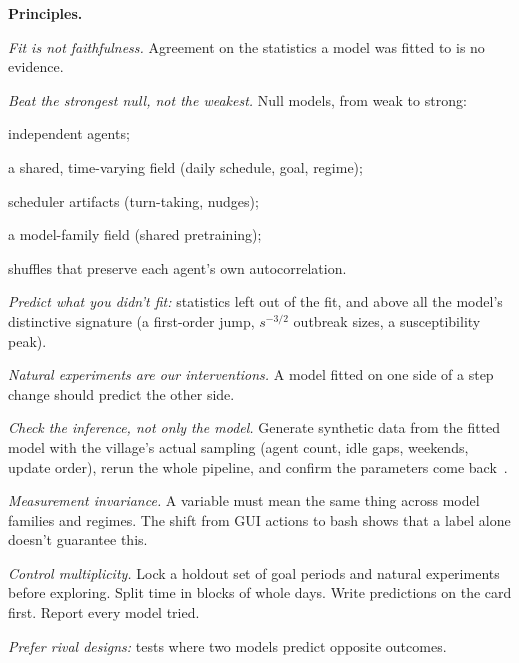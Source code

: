 \documentclass[reprint,aps,pre,10pt,superscriptaddress,nofootinbib]{revtex4-2}
\newenvironment{tight}{\begin{list}{\textbullet}{\setlength{\itemsep}{0pt}\setlength{\parsep}{0pt}\setlength{\topsep}{2pt}\setlength{\partopsep}{0pt}\setlength{\leftmargin}{1.1em}\setlength{\labelwidth}{0.6em}\setlength{\labelsep}{0.4em}}}{\end{list}}
\begin{document}
\textbf{Principles.}
\begin{tight}
\item \emph{Fit is not faithfulness.} Agreement on the statistics a model was fitted to is no evidence.
\item \emph{Beat the strongest null, not the weakest.} Null models, from weak to strong:
  \begin{tight}
  \item independent agents;
  \item a shared, time-varying field (daily schedule, goal, regime);
  \item scheduler artifacts (turn-taking, nudges);
  \item a model-family field (shared pretraining);
  \item shuffles that preserve each agent's own autocorrelation.
  \end{tight}
\item \emph{Predict what you didn't fit:} statistics left out of the fit, and above all the model's distinctive signature (a first-order jump, $s^{-3/2}$ outbreak sizes, a susceptibility peak).
\item \emph{Natural experiments are our interventions.} A model fitted on one side of a step change should predict the other side.
\item \emph{Check the inference, not only the model.} Generate synthetic data from the fitted model with the village's actual sampling (agent count, idle gaps, weekends, update order), rerun the whole pipeline, and confirm the parameters come back~\cite{talts2018}.
\item \emph{Measurement invariance.} A variable must mean the same thing across model families and regimes. The shift from GUI actions to bash shows that a label alone doesn't guarantee this.
\item \emph{Control multiplicity.} Lock a holdout set of goal periods and natural experiments before exploring. Split time in blocks of whole days. Write predictions on the card first. Report every model tried.
\item \emph{Prefer rival designs:} tests where two models predict opposite outcomes.
\end{tight}
\end{document}
